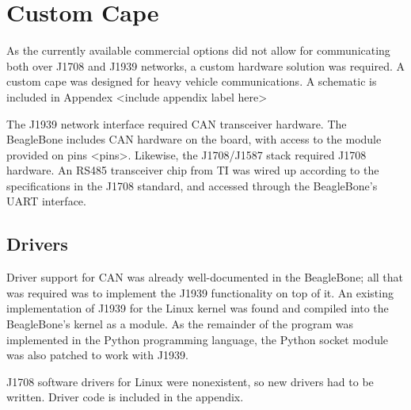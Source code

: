 \section{Custom Cape}

As the currently available commercial options did not allow for communicating both over J1708 and J1939 networks, a custom
hardware solution was required. A custom cape was designed for heavy vehicle communications. A schematic is included in 
Appendex <include appendix label here>

The J1939 network interface required CAN transceiver hardware. The BeagleBone includes CAN hardware on the board, with access
to the module provided on pins <pins>. Likewise, the J1708/J1587 stack required J1708 hardware. An RS485 transceiver chip from TI
was wired up according to the specifications in the J1708 standard, and accessed through the BeagleBone's UART interface.

\subsection{Drivers}

Driver support for CAN was already well-documented in the BeagleBone; all that was required was to implement the J1939
functionality on top of it. An existing implementation of J1939 for the Linux kernel was found and compiled into
the BeagleBone's kernel as a module. As the remainder of the program was implemented in the Python programming language,
the Python socket module was also patched to work with J1939.

J1708 software drivers for Linux were nonexistent, so new drivers had to be written. Driver code is included in the
appendix.
